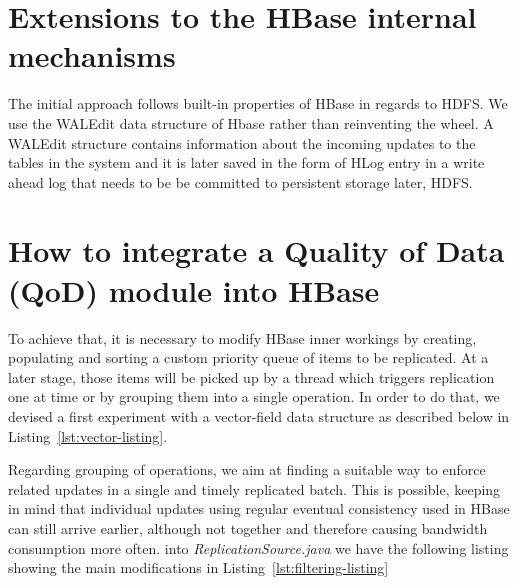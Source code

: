 \section{Extensions to the HBase internal mechanisms}\label{proposal}
The initial approach follows built-in properties of HBase in regards to HDFS. We use the WALEdit data structure of Hbase rather than reinventing the wheel. A WALEdit structure contains information about the incoming updates to the tables in the system and it is later saved in the form of HLog entry in a write ahead log that needs to be be committed to persistent storage later, HDFS.


\section{How to integrate a Quality of Data (QoD) module into HBase}\label{integration}
To achieve that, it is necessary to modify HBase inner workings by creating, populating and sorting a custom priority queue of items to be replicated. At a later stage, those items will be picked up by a thread which triggers replication one at time or by grouping them into a single operation. In order to do that, we devised a first experiment with a vector-field data structure as described below in Listing~\ref{lst:vector-listing}.


Regarding grouping of operations, we aim at finding a suitable way to enforce related updates in a single and timely replicated batch. This is possible, keeping in mind that individual updates using regular eventual consistency used in HBase can still arrive earlier, although not together and therefore causing bandwidth consumption more often.  into \emph{ReplicationSource.java} we have the following listing showing the main modifications in Listing~\ref{lst:filtering-listing}





